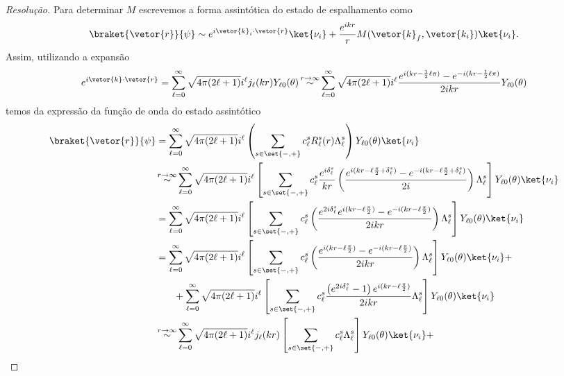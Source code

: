 \begin{proof}[Resolução]
   Para determinar \(M\) escrevemos a forma assintótica do estado de espalhamento como
   \begin{equation*}
      \braket{\vetor{r}}{\psi} \sim e^{i \vetor{k}_i \cdot \vetor{r}} \ket{\nu_i} + \frac{e^{ikr}}{r} M(\vetor{k}_f, \vetor{k_i}) \ket{\nu_i}.
   \end{equation*}
   Assim, utilizando a expansão
   \begin{equation*}
      e^{i \vetor{k} \cdot \vetor{r}} = \sum_{\ell = 0}^\infty \sqrt{4\pi(2\ell + 1)} i^\ell j_\ell(kr) Y_{\ell0}(\theta) \mathop{\sim}^{r\to\infty} \sum_{\ell = 0}^\infty \sqrt{4\pi(2\ell + 1)} i^\ell \frac{e^{i(kr - \frac12 \ell \pi)} - e^{-i(kr - \frac12 \ell \pi)}}{2ikr} Y_{\ell0}(\theta)
   \end{equation*}
   temos da expressão da função de onda do estado assintótico
   \begin{align*}
      \braket{\vetor{r}}{\psi} 
      &= \sum_{\ell=0}^\infty \sqrt{4\pi(2\ell + 1)} i^\ell \left(\sum_{s \in \set{-,+}} c^s_{\ell} R_\ell^s(r) \Lambda_\ell^s \right) Y_{\ell 0}(\theta) \ket{\nu_i}\\
      &\mathop{\sim}^{r\to\infty} \sum_{\ell = 0}^\infty \sqrt{4\pi(2\ell + 1)} i^{\ell} \left[\sum_{s \in\set{-,+}}c_\ell^s \frac{e^{i \delta_\ell^s}}{kr}\left(\frac{e^{i(kr - \ell \frac\pi2 + \delta_\ell^s)} - e^{-i(kr - \ell \frac\pi2 + \delta_{\ell}^s)}}{2i}\right)\Lambda^s_\ell\right] Y_{\ell 0}(\theta) \ket{\nu_i}\\
      &= \sum_{\ell = 0}^\infty \sqrt{4\pi(2\ell + 1)} i^{\ell} \left[\sum_{s \in\set{-,+}}c_\ell^s \left(\frac{e^{2i \delta_{\ell}^s}e^{i(kr - \ell \frac\pi2)} - e^{-i(kr - \ell \frac\pi2)}}{2ikr}\right)\Lambda^s_\ell\right] Y_{\ell 0}(\theta) \ket{\nu_i}\\
      &= \sum_{\ell = 0}^\infty \sqrt{4\pi(2\ell + 1)} i^{\ell} \left[\sum_{s \in\set{-,+}}c_\ell^s \left(\frac{e^{i(kr - \ell \frac\pi2)} - e^{-i(kr - \ell \frac\pi2)}}{2ikr}\right)\Lambda^s_\ell\right] Y_{\ell 0}(\theta) \ket{\nu_i} + \\
      &{}\phantom{= + } + 
      \sum_{\ell = 0}^\infty \sqrt{4\pi(2\ell + 1)} i^{\ell} \left[\sum_{s \in\set{-,+}}c_\ell^s \frac{\left(e^{2i \delta_{\ell}^s} - 1\right)e^{i(kr - \ell \frac\pi2)}}{2ikr}\Lambda^s_\ell\right] Y_{\ell 0}(\theta) \ket{\nu_i}\\
      &\mathop{\sim}^{r\to\infty}\sum_{\ell = 0}^\infty \sqrt{4\pi(2\ell + 1)} i^{\ell} j_{\ell}(kr)\left[\sum_{s \in\set{-,+}}c_\ell^s \Lambda^s_\ell\right] Y_{\ell 0}(\theta) \ket{\nu_i} +\\

\end{align*}
\end{proof}
